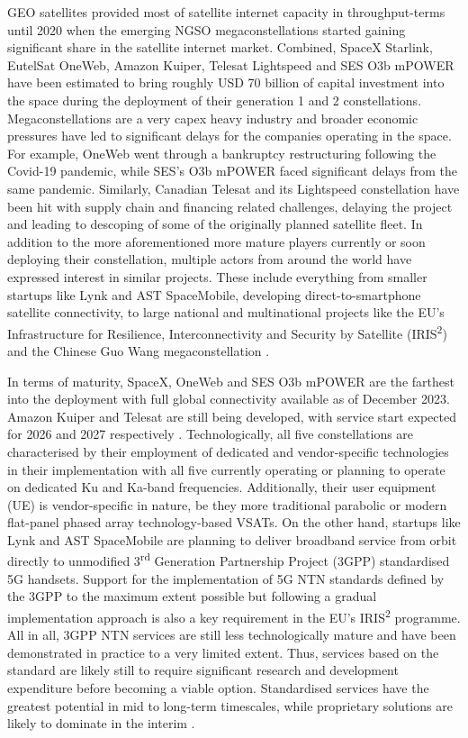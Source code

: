 \documentclass[english, 12pt, a4paper, elec, utf8, a-1b, online]{aaltothesis}
\begin{document}
GEO satellites provided most of satellite internet capacity in throughput-terms until 2020 when the emerging NGSO megaconstellations started gaining significant share in the satellite internet market.
Combined, SpaceX Starlink, EutelSat OneWeb, Amazon Kuiper, Telesat Lightspeed and SES O3b mPOWER have been estimated to bring roughly USD 70 billion of capital investment into the space during the deployment of their generation 1 and 2 constellations.
Megaconstellations are a very capex heavy industry and broader economic pressures have led to significant delays for the companies operating in the space.
For example, OneWeb went through a bankruptcy restructuring following the Covid-19 pandemic, while SES's O3b mPOWER faced significant delays from the same pandemic.
Similarly, Canadian Telesat and its Lightspeed constellation have been hit with supply chain and financing related challenges, delaying the project and leading to descoping of some of the originally planned satellite fleet.
In addition to the more aforementioned more mature players currently or soon deploying their constellation, multiple actors from around the world have expressed interest in similar projects.
These include everything from smaller startups like Lynk and AST SpaceMobile, developing direct-to-smartphone satellite connectivity, to large national and multinational projects like the EU's Infrastructure for Resilience, Interconnectivity and Security by Satellite (IRIS\textsuperscript{2}) and the Chinese Guo Wang megaconstellation \cite{euroconsult-ngso-tracker-2023-q3}.

In terms of maturity, SpaceX, OneWeb and SES O3b mPOWER are the farthest into the deployment with full global connectivity available as of December 2023.
Amazon Kuiper and Telesat are still being developed, with service start expected for 2026 and 2027 respectively \cite{euroconsult-ngso-tracker-2023-q3}.
Technologically, all five constellations are characterised by their employment of dedicated and vendor-specific technologies in their implementation with all five currently operating or planning to operate on dedicated Ku and Ka-band frequencies.
Additionally, their user equipment (UE) is vendor-specific in nature, be they more traditional parabolic or modern flat-panel phased array technology-based VSATs.
On the other hand, startups like Lynk and AST SpaceMobile are planning to deliver broadband service from orbit directly to unmodified 3\textsuperscript{rd} Generation Partnership Project (3GPP) standardised 5G handsets.
Support for the implementation of 5G NTN standards defined by the 3GPP to the maximum extent possible but following a gradual implementation approach is also a key requirement in the EU's IRIS\textsuperscript{2} programme.
All in all, 3GPP NTN services are still less technologically mature and have been demonstrated in practice to a very limited extent.
Thus, services based on the standard are likely still to require significant research and development expenditure before becoming a viable option.
Standardised services have the greatest potential in mid to long-term timescales, while proprietary solutions are likely to dominate in the interim \cite{iris2-industryday-2023-03, nsr-5g-via-satellite-2023, nsr-direct-to-device-market-2023}.
\end{document}
